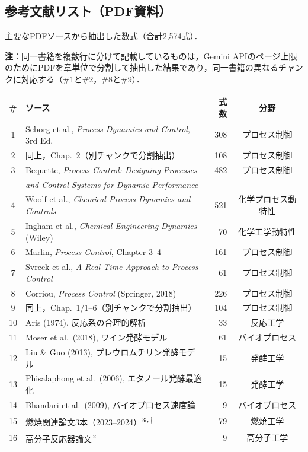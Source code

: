 \documentclass[11pt,a4paper]{ltjsarticle}
\begin{document}
\subsection{参考文献リスト（PDF資料）}

主要なPDFソースから抽出した数式（合計2,574式）．

\textbf{注}：同一書籍を複数行に分けて記載しているものは，Gemini APIのページ上限のためにPDFを章単位で分割して抽出した結果であり，同一書籍の異なるチャンクに対応する（\#1と\#2，\#8と\#9）．

\begin{longtable}{clrc}
\toprule
\# & ソース & 式数 & 分野 \\
\midrule
\endhead
1 & Seborg et al., \textit{Process Dynamics and Control}, 3rd Ed. & 308 & プロセス制御 \\
2 & \quad 同上，Chap.~2（別チャンクで分割抽出） & 108 & プロセス制御 \\
3 & Bequette, \textit{Process Control: Designing Processes} & 482 & プロセス制御 \\
  & \textit{and Control Systems for Dynamic Performance} & & \\
4 & Woolf et al., \textit{Chemical Process Dynamics and Controls} & 521 & 化学プロセス動特性 \\
5 & Ingham et al., \textit{Chemical Engineering Dynamics} (Wiley) & 70 & 化学工学動特性 \\
6 & Marlin, \textit{Process Control}, Chapter 3--4 & 161 & プロセス制御 \\
7 & Svrcek et al., \textit{A Real Time Approach to Process Control} & 61 & プロセス制御 \\
8 & Corriou, \textit{Process Control} (Springer, 2018) & 226 & プロセス制御 \\
9 & \quad 同上，Chap.~1/1--6（別チャンクで分割抽出） & 104 & プロセス制御 \\
10 & Aris (1974), 反応系の合理的解析 & 33 & 反応工学 \\
11 & Moser et al.\ (2018), ワイン発酵モデル & 61 & バイオプロセス \\
12 & Liu \& Guo (2013), プレウロムチリン発酵モデル & 15 & 発酵工学 \\
13 & Phisalaphong et al.\ (2006), エタノール発酵最適化 & 15 & 発酵工学 \\
14 & Bhandari et al.\ (2009), バイオプロセス速度論 & 9 & バイオプロセス \\
15 & 燃焼関連論文3本（2023--2024）\textsuperscript{※,\,†} & 79 & 燃焼工学 \\
16 & 高分子反応器論文\textsuperscript{※} & 9 & 高分子工学 \\

\end{longtable}
\end{document}
